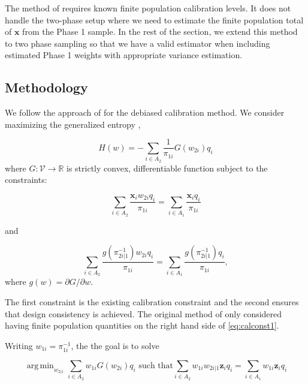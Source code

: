 \documentclass[12pt]{article}
\DeclareMathOperator*{\argmin}{arg\,min}
\newcommand{\R}{\mathbb{R}}
\renewcommand{\bf}[1]{\mathbf{#1}}
\begin{document}
The method of \cite{kwon2024debiased} requires known finite population 
calibration levels. It does not handle the
two-phase setup where we need to estimate the finite population total of $\bf x$
from the Phase 1 sample. In the rest of the section, we extend this method to 
two phase sampling so that we have a valid 
estimator when including estimated Phase 1 weights with appropriate variance
estimation.

\subsection{Methodology}

We follow the approach of \cite{kwon2024debiased} for the debiased calibration
method. We consider maximizing the generalized entropy \cite{gneiting2007strictly},

\begin{equation}\label{eq:primalloss}
  H(w) = - \sum_{i \in A_2} \frac{1}{\pi_{1i}} G(w_{2i}) q_i
\end{equation}
where $G: \mathcal{V} \to \R$ is strictly convex, differentiable function
subject to the constraints:

\begin{equation}\label{eq:calconst1}
  \sum_{i \in A_2} \frac{\bf x_i w_{2i}q_i}{\pi_{1i}} = 
\sum_{i \in A_1} \frac{\bf x_iq_i}{\pi_{1i}}
\end{equation}

and 

\begin{equation}\label{eq:calconst2}
  \sum_{i \in A_2} \frac{g(\pi_{2i|1}^{-1})w_{2i}q_i}{\pi_{1i}} = 
  \sum_{i \in A_1} \frac{g(\pi_{2i|1}^{-1})q_i}{\pi_{1i}}, 
\end{equation}
where $g(w) = \partial G / \partial w$. 

The first constraint is the existing calibration constraint and the second
ensures that design consistency is achieved. 
The original method of \cite{kwon2024debiased} only considered having finite
population quantities on the right hand side of \eqref{eq:calconst1}.

Writing $w_{1i} = \pi_{1i}^{-1}$, the the goal is to solve

\begin{equation}\label{eq:primal}
  \argmin_{w_{2|1}} \sum_{i \in A_2} w_{1i} G(w_{2i}) q_i 
  \text{ such that}
  \sum_{i \in A_2} w_{1i} w_{2i|1} \bf z_i q_i = \sum_{i \in A_1} w_{1i} \bf z_i q_i
\end{equation}
\end{document}
